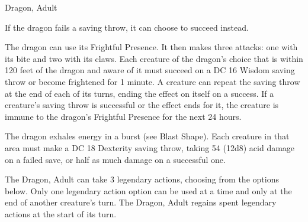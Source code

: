 \begin{DndMonster}[float*=b,width=\textwidth + 8pt]{Dragon, Adult}
\begin{multicols}{2}
 If the dragon fails a saving throw, it can choose to succeed instead.

 The dragon can use its Frightful Presence. It then makes three attacks: one with its bite and two with its claws.
\DndMonsterAttack[
	name=Bite,
	distance=melee,
	type=weapon,
	mod=+11,
	reach=10,
	dmg=\DndDice{2d10 + 6},
	dmg-type=piercing,
	extra={ plus 4 (1d8) damage of the dragon's Damage Type.}
]
\DndMonsterAttack[
	name=Claw,
	distance=melee,
	type=weapon,
	mod=+11,
	reach=5,
	dmg=\DndDice{2d6 + 6},
	dmg-type=slashing
]
\DndMonsterAttack[
	name=Tail,
	distance=melee,
	type=weapon,
	mod=+11,
	reach=15,
	dmg=\DndDice{2d8 + 6},
	dmg-type=bludgeoning
]
Each creature of the dragon's choice that is within 120 feet of the dragon and aware of it must succeed on a DC 16 Wisdom saving throw or become frightened for 1 minute. A creature can repeat the saving throw at the end of each of its turns, ending the effect on itself on a success. If a creature's saving throw is successful or the effect ends for it, the creature is immune to the dragon's Frightful Presence for the next 24 hours.

The dragon exhales energy in a burst (see Blast Shape). Each creature in that area must make a DC 18 Dexterity saving throw, taking 54 (12d8) acid damage on a failed save, or half as much damage on a successful one.

The Dragon, Adult can take 3 legendary actions, choosing from the options below. Only one legendary action option can be used at a time and only at the end of another creature's turn. The Dragon, Adult regains spent legendary actions at the start of its turn.
\begin{DndMonsterLegendaryActions}
\end{DndMonsterLegendaryActions}
\end{multicols}
\end{DndMonster}

